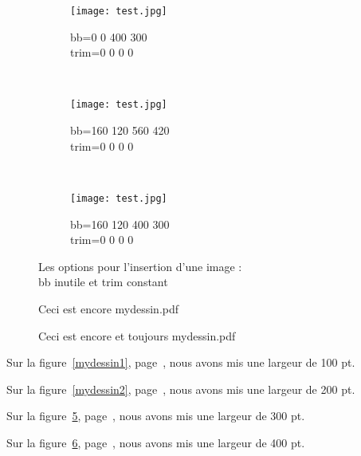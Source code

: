 \begin{figure}[h]
    \centering
    \begin{subfigure}[b]{0.3\textwidth}
        \texttt{[image: test.jpg]}
        \caption{bb=0 0 400 300\\trim=0 0 0 0}
        \label{essai_a}
    \end{subfigure}
    ~
    \begin{subfigure}[b]{0.3\textwidth}
        \texttt{[image: test.jpg]}
        \caption{bb=160 120 560 420\\trim=0 0 0 0}
        \label{essai_2}
    \end{subfigure}
    ~
    \begin{subfigure}[b]{0.3\textwidth}
        \texttt{[image: test.jpg]}
        \caption{bb=160 120 400 300\\trim=0 0 0 0}
        \label{essai_3}
    \end{subfigure}
    \caption{Les options pour l'insertion d'une image :\\bb inutile et trim constant}%
    \label{bb inutile et trim constant}

\end{figure}


\begin{figure}[!h]
\centering
\caption{Ceci est encore mydessin.pdf}
\label{mydessin3}
\end{figure}

\begin{figure}[!h]
\centering
\caption{Ceci est encore et toujours mydessin.pdf}
\label{mydessin4}
\end{figure}

Sur la figure~\ref{mydessin1}, page~\pageref{mydessin1}, nous avons mis une largeur de 100 pt.

Sur la figure~\ref{mydessin2}, page~\pageref{mydessin2}, nous avons mis une largeur de 200 pt.

Sur la figure~\ref{mydessin3}, page~\pageref{mydessin3}, nous avons mis une largeur de 300 pt.

Sur la figure~\ref{mydessin4}, page~\pageref{mydessin4}, nous avons mis une largeur de 400 pt.

\listoffigures


